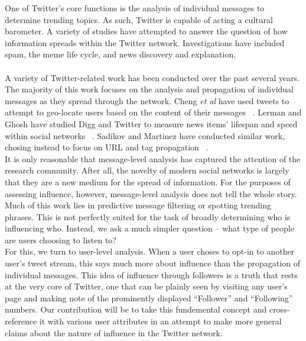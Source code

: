 One of Twitter's core functions is the analysis of individual messages to determine trending topics.  As such, Twitter is capable of acting a cultural barometer.  A variety of studies have attempted to answer the question of how information spreads within the Twitter network.  Investigations have included spam, the meme life cycle, and news discovery and explanation.\\\\
A variety of Twitter-related work has been conducted over the past several years.  The majority of this work focuses on the analysis and propagation of individual messages as they spread through the network.  Cheng \textit{et al} have used tweets to attempt to geo-locate users based on the content of their messages ~\cite{CCL10}.  Lerman and Ghosh have studied Digg and Twitter to measure news items' lifespan and speed within social networks ~\cite{LG10}.  Sadikov and Martinez have conducted similar work, chosing instead to focus on URL and tag propagation ~\cite{SM09}.\\
It is only reasonable that message-level analysis has captured the attention of the research community.  After all, the novelty of modern social networks is largely that they are a new medium for the spread of information.  For the purposes of assessing influence, however, message-level analysis does not tell the whole story.  Much of this work lies in predictive message filtering or spotting trending phrases.  This is not perfectly suited for the task of broadly determining who is influencing who.  Instead, we ask a much simpler question -- what type of people are users choosing to listen to?\\
For this, we turn to user-level analysis.  When a user choses to opt-in to another user's tweet stream, this says much more about influence than the propagation of individual messages.  This idea of influence through followers is a truth that rests at the very core of Twitter, one that can be plainly seen by visiting any user's page and making note of the prominently displayed ``Follower'' and ``Following'' numbers.  Our contribution will be to take this fundemental concept and cross-reference it with various user attributes in an attempt to make more general claims about the nature of influence in the Twitter network.